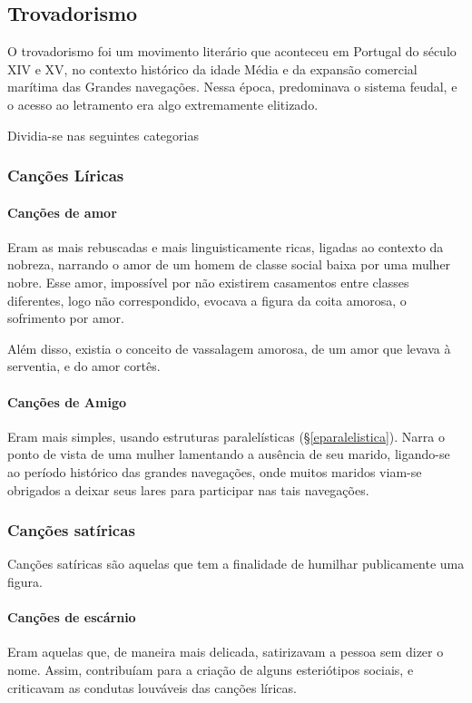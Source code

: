 \documentclass{article}
\begin{document}
\subsection{Trovadorismo}
O trovadorismo foi um movimento literário que aconteceu em Portugal do século XIV e XV, no contexto histórico da idade Média e da expansão comercial marítima das Grandes navegações. Nessa época, predominava o sistema feudal, e o acesso ao letramento era algo extremamente elitizado.

Dividia-se nas seguintes categorias
\subsubsection{Canções Líricas}
\paragraph{Canções de amor} 
Eram as mais rebuscadas e mais linguisticamente ricas, ligadas ao contexto da nobreza, narrando o amor de um homem de classe social baixa por uma mulher nobre. Esse amor, impossível por não existirem casamentos entre classes diferentes, logo não correspondido, evocava a figura da coita amorosa, o sofrimento por amor.

Além disso, existia o conceito de vassalagem amorosa, de um amor que levava à serventia, e do amor cortês.

\paragraph{Canções de Amigo}
Eram mais simples, usando estruturas paralelísticas (\S\ref{eparalelistica}). Narra o ponto de vista de uma mulher lamentando a ausência de seu marido, ligando-se ao período histórico das grandes navegações, onde muitos maridos viam-se obrigados a deixar seus lares para participar nas tais navegações.

\subsubsection{Canções satíricas}
Canções satíricas são aquelas que tem a finalidade de humilhar publicamente uma figura.
\paragraph{Canções de escárnio} 
Eram aquelas que, de maneira mais delicada, satirizavam a pessoa sem dizer o nome. Assim, contribuíam para a criação de alguns esteriótipos sociais, e criticavam as condutas louváveis das canções líricas.
\end{document}
